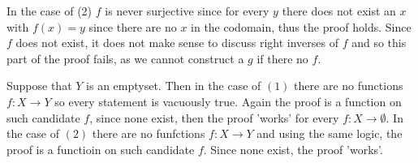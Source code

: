 \documentclass[11pt]{amsart}
\theoremstyle{definition}
\numberwithin{theorem}{section}
\numberwithin{definition}{section}
\numberwithin{equation}{section}
\begin{document}
{\begin{enumerate}
In the case of (2) $f$ is never surjective since for every $y$ there does not exist an $x$ with $f(x) = y$ since there are no $x$ in the codomain, thus the proof holds. Since $f$ does not exist, it does not make sense to discuss right inverses of $f$ and so this part of the proof fails, as we cannot construct a $g$ if there no $f.$

Suppose that $Y$ is an emptyset. Then in the case of $(1)$ there are no functions $f: X \to Y$ so every statement is vacuously true. Again the proof is a function on such candidate $f$, since none exist, then the proof 'works' for every $f: X \to \emptyset$. In the case of $(2)$ there are no funfctions $f: X \to Y$ and using the same logic, the proof is a functioin on such candidate $f$. Since none exist, the proof 'works'.
\end{enumerate}
\medskip {}}
\end{document}
